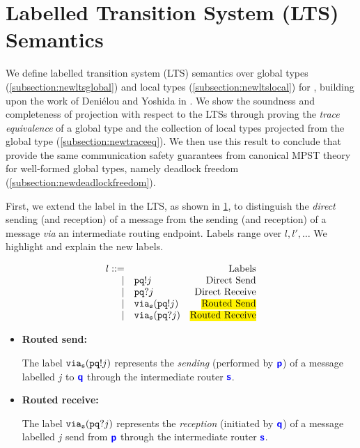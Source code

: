 \section{Labelled Transition System (LTS) Semantics}
\label{section:lts}

We define labelled transition system (LTS) semantics
over global types (\cref{subsection:newltsglobal}) 
and local types (\cref{subsection:newltslocal})
for \newtheory,
building upon the work of Deni\'elou and Yoshida in
\cite{characterisation}.
We show the soundness and completeness of projection
with respect to the LTSs through proving the
\textit{trace equivalence} of
a global type and the collection of local types projected
from the global type (\cref{subsection:newtraceeq}).
We then use this result to
conclude that \newtheory provide the same
communication safety guarantees from canonical
MPST theory for well-formed global types, 
namely deadlock freedom (\cref{subsection:newdeadlockfreedom}).

First, we extend the label in the LTS, as shown in 
\cref{fig:newlts}, to distinguish
the \textit{direct} sending (and reception) of a message
from the sending (and reception) of a message
\textit{via} an intermediate routing endpoint.
Labels range over $l, l', \dots$
We highlight and explain the new labels.

\begin{figure}[!h]
\doublespacing
\[
\begin{array}{rlr}
l ::= & & \text{Labels} \\
	\mid & \aout{p}{q}{j} & 
		\text{Direct Send} \\
	\mid & \ain{p}{q}{j} & 
		\text{Direct Receive} \\
	\mid & \via{s}{\aout{p}{q}{j}} & 
		\text{\hl{Routed Send}} \\
	\mid & \via{s}{\ain{p}{q}{j}} & 
		\text{\hl{Routed Receive}} \\
\end{array}
\]
\singlespacing
{}
\label{fig:newlts}
\end{figure}

\begin{itemize}
\item \textbf{Routed send:}

The label ${\texttt{via}_{{\mathtt{s}}}({{\mathtt{p}}{\mathtt{q}}!{j}})}$ represents the
\textit{sending} (performed by ${\color{blue}\bm{\mathsf{p}}}$)
of a message labelled $j$ to ${\color{blue}\bm{\mathsf{q}}}$ through
the intermediate router ${\color{blue}\bm{\mathsf{s}}}$.

\item \textbf{Routed receive:}

The label ${\texttt{via}_{{\mathtt{s}}}({{\mathtt{p}}{\mathtt{q}}?{j}})}$ represents the
\textit{reception} (initiated by ${\color{blue}\bm{\mathsf{q}}}$) 
of a message labelled $j$
send from ${\color{blue}\bm{\mathsf{p}}}$ through
the intermediate router ${\color{blue}\bm{\mathsf{s}}}$.
\end{itemize}

